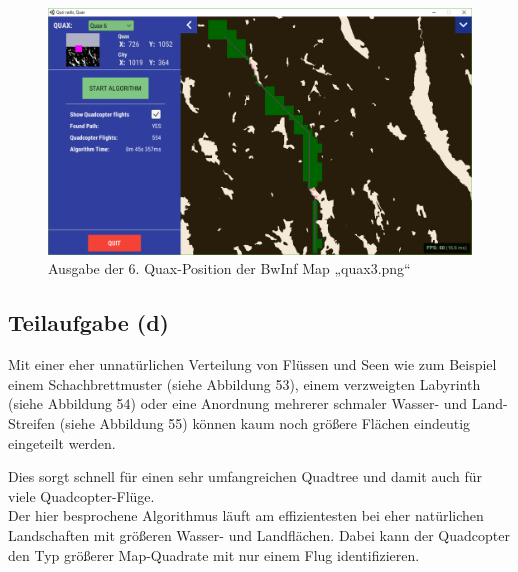 \documentclass[a4paper,12pt]{article}
\begin{document}
\begin{figure}[H]
\centering
    \includegraphics[width=1\linewidth]{Bilder/Aufgabe3/Programm/quax3_06.png}
    \caption{Ausgabe der 6. Quax-Position der BwInf Map „quax3.png“}
\end{figure}

\subsection{Teilaufgabe (d)}
Mit einer eher unnatürlichen Verteilung von Flüssen und Seen wie zum Beispiel einem Schachbrettmuster (siehe Abbildung 53), einem verzweigten Labyrinth (siehe Abbildung 54) oder eine Anordnung mehrerer schmaler Wasser- und Land-Streifen (siehe Abbildung 55) können kaum noch größere Flächen eindeutig eingeteilt werden.

Dies sorgt schnell für einen sehr umfangreichen Quadtree und damit auch für viele Quadcopter-Flüge.
\\[0.4cm]
Der hier besprochene Algorithmus läuft am effizientesten bei eher natürlichen Landschaften mit größeren Wasser- und Landflächen. Dabei kann der Quadcopter den Typ größerer Map-Quadrate mit nur einem Flug identifizieren.
\end{document}
